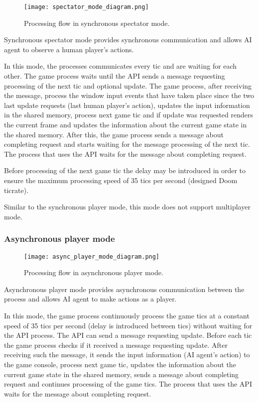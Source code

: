 	    \begin{figure}
			    \centering
			    \texttt{[image: spectator\_mode\_diagram.png]}
			    \caption{Processing flow in synchronous spectator mode.}\label{fig:spectator_mode_diagram}
	    \end{figure}
	    
	    Synchronous spectator mode provides synchronous communication and allows AI agent to observe a human player's actions. 
	    
	    In this mode, the processes communicates every tic and are waiting for each other. The game process waits until the API sends a message requesting processing of the next tic and optional update. The game process, after receiving the message, process the window input events that have taken place since the two last update requests (last human player's action), updates the input information in the shared memory, process next game tic and if update was requested renders the current frame and updates the information about the current game state in the shared memory. After this, the game process sends a message about completing request and starts waiting for the message processing of the next tic. The process that uses the API waits for the message about completing request.

        Before processing of the next game tic the delay may be introduced in order to ensure the maximum processing speed of 35 tics per second (designed Doom ticrate).
        
        Similar to the synchronous player mode, this mode does not support multiplayer mode.

    \subsubsection{Asynchronous player mode}\label{sec:architecture_async_player_mode}

	    \begin{figure}
			    \centering
			    \texttt{[image: async\_player\_mode\_diagram.png]}
			    \caption{Processing flow in asynchronous player mode.}\label{fig:async_player_mode_diagram}
	    \end{figure}
	    
	    Asynchronous player mode provides asynchronous communication between the process and allows AI agent to make actions as a player. 
	    
	    In this mode, the game process continuously process the game tics at a constant speed of 35 tics per second (delay is introduced between tics) without waiting for the API process. The API can send a message requesting update. Before each tic the game process checks if it received a message requesting update. After receiving such the message, it sends the input information (AI agent's action) to the game console, process next game tic, updates the information about the current game state in the shared memory, sends a message about completing request and continues processing of the game tics. The process that uses the API waits for the message about completing request.
	    
